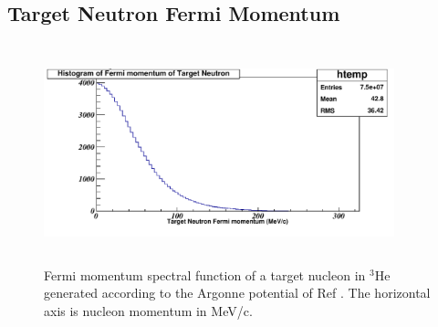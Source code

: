 %
%

\subsection{Target Neutron Fermi Momentum 
\label{sec:fermimotion}}

\begin{figure}[!hbt]
    \centering
    \includegraphics[width=4.0in,height=2.5in]{./figures/Fermi.pdf}
    \caption{Fermi momentum spectral function of a target nucleon in $^3$He
      generated according to the Argonne potential of Ref \cite{fermipaper}.
      The horizontal axis is nucleon momentum in MeV/c.}
    \label{fig:fermi}
\end{figure}

